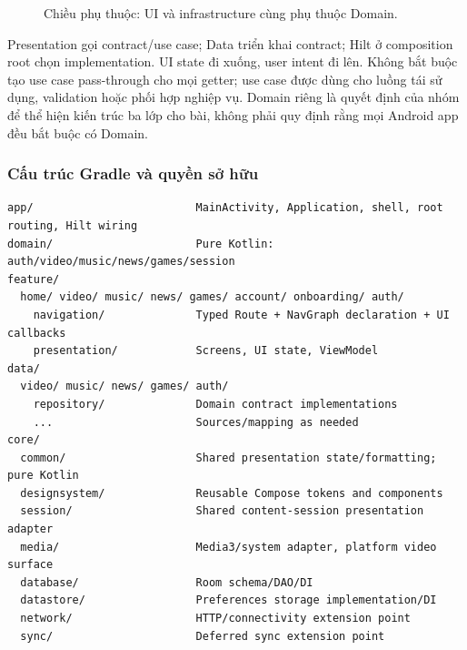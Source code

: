 \begin{figure}[htbp]
\centering
{}
\caption{Chiều phụ thuộc: UI và infrastructure cùng phụ thuộc Domain.}
\label{fig:architecture-dependencies}
\end{figure}

Presentation gọi contract/use case; Data triển khai contract; Hilt ở composition root chọn implementation. UI state đi xuống, user intent đi lên. Không bắt buộc tạo use case pass-through cho mọi getter; use case được dùng cho luồng tái sử dụng, validation hoặc phối hợp nghiệp vụ. Domain riêng là quyết định của nhóm để thể hiện kiến trúc ba lớp cho bài, không phải quy định rằng mọi Android app đều bắt buộc có Domain.

\subsubsection{Cấu trúc Gradle và quyền sở hữu}
\label{sec:module-structure}

\begin{lstlisting}[language={},basicstyle=\ttfamily\footnotesize,columns=fullflexible,breaklines=true,frame=single]
app/                         MainActivity, Application, shell, root routing, Hilt wiring
domain/                      Pure Kotlin: auth/video/music/news/games/session
feature/
  home/ video/ music/ news/ games/ account/ onboarding/ auth/
    navigation/              Typed Route + NavGraph declaration + UI callbacks
    presentation/            Screens, UI state, ViewModel
data/
  video/ music/ news/ games/ auth/
    repository/              Domain contract implementations
    ...                      Sources/mapping as needed
core/
  common/                    Shared presentation state/formatting; pure Kotlin
  designsystem/              Reusable Compose tokens and components
  session/                   Shared content-session presentation adapter
  media/                     Media3/system adapter, platform video surface
  database/                  Room schema/DAO/DI
  datastore/                 Preferences storage implementation/DI
  network/                   HTTP/connectivity extension point
  sync/                      Deferred sync extension point
\end{lstlisting}

